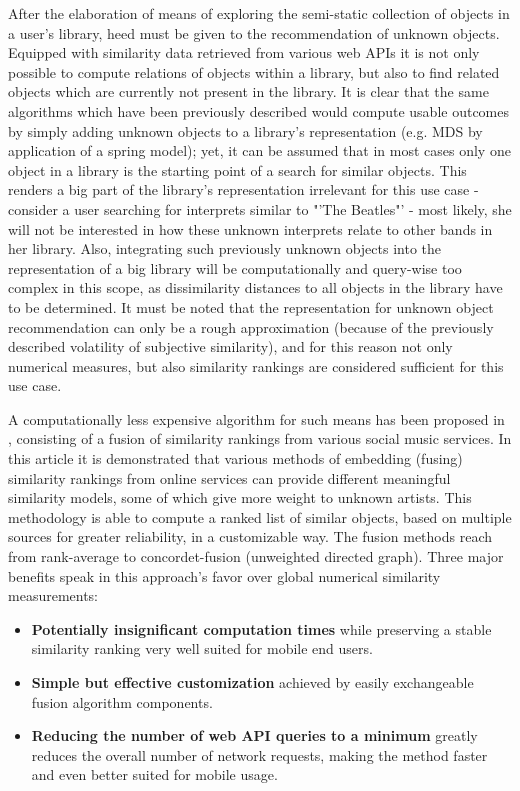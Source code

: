 After the elaboration of means of exploring the semi-static collection of objects in a user's library, heed must be given to the recommendation of unknown objects. Equipped with similarity data retrieved from various web APIs it is not only possible to compute relations of objects within a library, but also to find related objects which are currently not present in the library. It is clear that the same algorithms which have been previously described would compute usable outcomes by simply adding unknown objects to a library's representation (e.g. MDS by application of a spring model); yet, it can be assumed that in most cases only one object in a library is the starting point of a search for similar objects. This renders a big part of the library's representation irrelevant for this use case - consider a user searching for interprets similar to "'The Beatles"' - most likely, she will not be interested in how these unknown interprets relate to other bands in her library. Also, integrating such previously unknown objects into the representation of a big library will be computationally and query-wise too complex in this scope, as dissimilarity distances to all objects in the library have to be determined. It must be noted that the representation for unknown object recommendation can only be a rough approximation (because of the previously described volatility of subjective similarity), and for this reason not only numerical measures, but also similarity rankings are considered sufficient for this use case.

A computationally less expensive algorithm for such means has been proposed in \cite{Marshall:2010}, consisting of a fusion of similarity rankings from various social music services. In this article it is demonstrated that various methods of embedding (fusing) similarity rankings from online services can provide different meaningful similarity models, some of which give more weight to unknown artists. This methodology is able to compute a ranked list of similar objects, based on multiple sources for greater reliability, in a customizable way. The fusion methods reach from rank-average to concordet-fusion (unweighted directed graph). Three major benefits speak in this approach's favor over global numerical similarity measurements:

\begin{itemize}
	\item \textbf{Potentially insignificant computation times} while preserving a stable similarity ranking very well suited for mobile end users.
	\item \textbf{Simple but effective customization} achieved by easily exchangeable fusion algorithm components.
	\item \textbf{Reducing the number of web API queries to a minimum} greatly reduces the overall number of network requests, making the method faster and even better suited for mobile usage.
\end{itemize}

